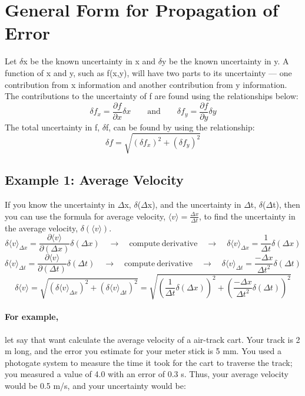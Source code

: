 \section*{General Form for Propagation of Error}
Let $\delta$x be the known uncertainty in x and $\delta$y be the known uncertainty in y. 
A function of x and y, such as f(x,y), will have two parts to its uncertainty — one contribution from x information and another contribution from y information. 
The contributions to the uncertainty of f are found using the relationships below:
\[ \delta f_{x} = \frac{\partial f}{\partial x} \delta x \qquad \mathrm{and} \qquad \delta f_{y} = \frac{\partial f}{\partial y} \delta y \]
The total uncertainty in f, $\delta$f, can be found by using the relationship:
\begin{equation}
\delta f = \sqrt{(\delta f_{x})^{2}+(\delta f_{y})^{2}}
\end{equation}

\subsection*{Example 1: Average Velocity}
If you know the uncertainty in $\Delta$x, $\delta$($\Delta$x), and the uncertainty in $\Delta$t, $\delta$($\Delta$t), then you can use the formula for average velocity, $\langle v \rangle = \frac{\Delta x}{\Delta t}$, to find the uncertainty in the average velocity, $ \delta (\langle v \rangle)$.
\[ \delta \langle v \rangle_{\Delta x} = \frac{\partial \langle v \rangle}{\partial (\Delta x)} \delta (\Delta x)
   \quad \rightarrow \quad \mathrm{compute \ derivative} \quad \rightarrow \quad
   \delta \langle v \rangle_{\Delta x} = \frac{1}{\Delta t} \delta (\Delta x)\]
%
\[ \delta \langle v \rangle_{\Delta t} = \frac{\partial \langle v \rangle}{\partial (\Delta t)} \delta (\Delta t)
   \quad \rightarrow \quad \mathrm{compute \ derivative} \quad \rightarrow \quad
   \delta \langle v \rangle_{\Delta t} = \frac{-\Delta x}{\Delta t^{2}} \delta (\Delta t)\]
%
\[ \delta \langle v \rangle = \sqrt{(\delta \langle v \rangle_{\Delta x})^{2} 
   + (\delta \langle v \rangle_{\Delta t})^{2}} = \sqrt{\left(\frac{1}{\Delta t} \delta (\Delta x)\right)^{2} + \left(\frac{-\Delta x}{\Delta t^{2}} \delta (\Delta t)\right)^{2}} \]

\paragraph{For example,} let say that want calculate the average velocity of a air-track cart. Your track is 2 m long, and the error you estimate for your meter stick is 5 mm. You used a photogate system to measure the time it took for the cart to traverse the track; you measured a value of 4.0  with an error of 0.3 s. Thus, your average velocity would be 0.5 m/s, and your uncertainty would be:

